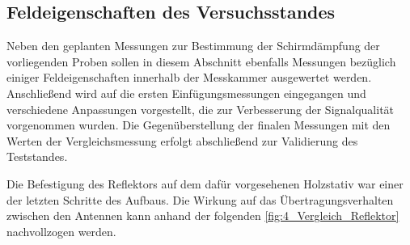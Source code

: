 
\subsection{Feldeigenschaften des Versuchsstandes}\label{cha:4_sub_Feldeigenschaften_Versuchsstand}

Neben den geplanten Messungen zur Bestimmung der Schirmdämpfung der vorliegenden Proben sollen in diesem Abschnitt ebenfalls Messungen bezüglich einiger Feldeigenschaften innerhalb der Messkammer ausgewertet werden. Anschließend wird auf die ersten Einfügungsmessungen eingegangen und verschiedene Anpassungen vorgestellt, die zur Verbesserung der Signalqualität vorgenommen wurden. Die Gegenüberstellung der finalen Messungen mit den Werten der Vergleichsmessung erfolgt abschließend zur Validierung des Teststandes.
\par
\vspace{\linespace}
Die Befestigung des Reflektors auf dem dafür vorgesehenen Holzstativ war einer der letzten Schritte des Aufbaus. Die Wirkung auf das Übertragungsverhalten zwischen den Antennen kann anhand der folgenden \Abb\ref{fig:4_Vergleich_Reflektor} nachvollzogen werden.
\par
\vspace{\linespace}


